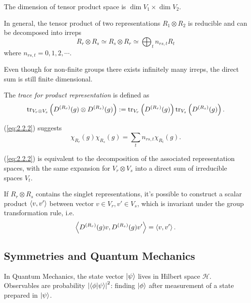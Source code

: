 \documentclass[a4paper,11pt]{article}
\begin{document}
	The dimension of tensor product space is $\dim V_1 \times \dim V_2$.

	\begin{prop}
		In general, the tensor product of two representations $R_1 \otimes R_2$ is reducible and can be decomposed into irreps
		\begin{equation}
			R_r \otimes R_s \simeq R_s \otimes R_r \simeq \bigoplus_t n _{rs,t} R_t
			\label{eq:2.2.2}
		\end{equation}
		where $n _{rs,t} = 0,1,2,\cdots$.

		Even though for non-finite groups there exists infinitely many irreps, the direct sum is still finite dimensional.
	\end{prop}


	\begin{defi}
		The \emph{trace for product representation} is defined as
		\[
			\tr _{V_r \otimes V_s} \left( D ^{(R_r)}(g) \otimes D ^{(R_s)}(g) \right):= \tr _{V_r} \left( D ^{(R_r)}(g) \right) \tr _{V_s} \left( D ^{(R_s)}(g) \right).
		\]
	\end{defi}
	\begin{cor}
		(\ref{eq:2.2.2}) suggests
		\[
			\chi _{R_r} (g) \chi _{R_s} (g) = \sum_t n _{rs,t} \chi _{R_t} (g).
		\]
	\end{cor}

	(\ref{eq:2.2.2}) is equivalent to the decomposition of the associated representation spaces, with the same expansion for $V_r \otimes V_s$ into a direct sum of irreducible spaces $V_t$.

	\begin{prop}
		If $R_r \otimes R_s$ contains the singlet representations, it's possible to construct a scalar product $\expval{v,v'}$ between vector $v \in V_r, v' \in V_s$, which is invariant under the group transformation rule, i.e.\
	\[
		\expval{D ^{(R_r)}(g)v, D ^{(R_s)}(g)v'} = \expval{v,v'}.
	\]
	\end{prop}

	\subsection{Symmetries and Quantum Mechanics}

	In Quantum Mechanics, the state vector $\ket{\psi}$ lives in Hilbert space $\mathcal{H}$. Observables are probability $\abs{\braket{\phi}{\psi}}^2$: finding $\ket{\phi}$ after measurement of a state prepared in $\ket{\psi}$.
\end{document}
